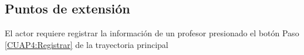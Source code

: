 	
	\subsection{Puntos de extensión}
	
	\UCExtensionPoint
	{El actor requiere registrar la información de un profesor presionado el botón }
	{ Paso \ref{CUAP4:Registrar} de la trayectoria principal}
	{}
